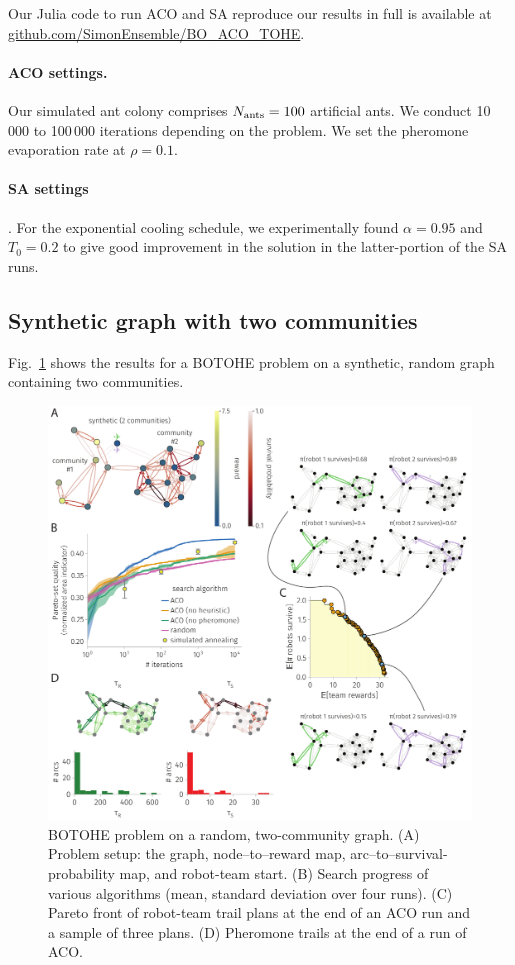 \documentclass[fleqn,10pt,lineno]{wlpeerj}
\begin{document}
Our Julia code to run ACO and SA reproduce our results in full is available at \url{github.com/SimonEnsemble/BO_ACO_TOHE}.

\paragraph{ACO settings.} Our simulated ant colony comprises $N_{\rm ants}=100$ artificial ants. We conduct 10\,000 to 100\,000 iterations depending on the problem.
We set the pheromone evaporation rate at $\rho=0.1$. 

\paragraph{SA settings}. For the exponential cooling schedule, we experimentally found $\alpha=0.95$ and $T_0=0.2$ to give good improvement in the solution in the latter-portion of the SA runs.
  
\subsection{Synthetic graph with two communities}
Fig.~\ref{fig:two_community} shows the results for a BOTOHE problem on a synthetic, random graph containing two communities.

\begin{figure}[h!]
    \centering
    	\includegraphics[width=\textwidth]{block_model_results.pdf}
    \caption{
    BOTOHE problem on a random, two-community graph. 
    (A) Problem setup: the graph, node--to--reward map, arc--to--survival-probability map, and robot-team start.
    (B) Search progress of various algorithms (mean, standard deviation over four runs).
    (C) Pareto front of robot-team trail plans at the end of an ACO run and a sample of three plans.
    (D) Pheromone trails at the end of a run of ACO.
    } \label{fig:two_community}
\end{figure}
\end{document}
